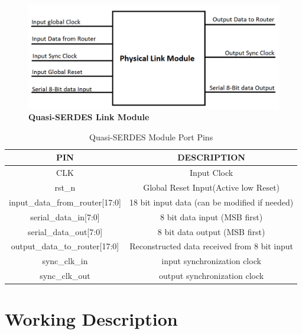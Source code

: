 \begin{centering}
\begin{figure}[H]
  \centering
   \includegraphics[scale=0.4]{./figs/physicalModule}
  \caption{\textbf{Quasi-SERDES Link Module}}
  \label{Quasi-SERDESModule}
\end{figure}
\end{centering}


\begin{table} [!h]
\caption{Quasi-SERDES Module Port Pins}
  \begin{center}
 \begin{tabular}{||c | c||} 
 \hline
    \textbf{PIN} & \textbf{DESCRIPTION} \\ \hline
    CLK & Input Clock \\
    rst\_n & Global Reset Input(Active low Reset)\\
    input\_data\_from\_router[17:0] & 18 bit input data (can be modified if needed)\\
    serial\_data\_in[7:0] & 8 bit data input (MSB first)\\
    serial\_data\_out[7:0] & 8 bit data output (MSB first)\\
    output\_data\_to\_router[17:0] & Reconstructed data received from 8 bit input \\
    sync\_clk\_in & input synchronization clock \\
    sync\_clk\_out & output synchronization clock \\
 \hline
\end{tabular}
\end{center}
\label{Quasi-SERDES_pins}
\end{table}

\section{Working Description}


